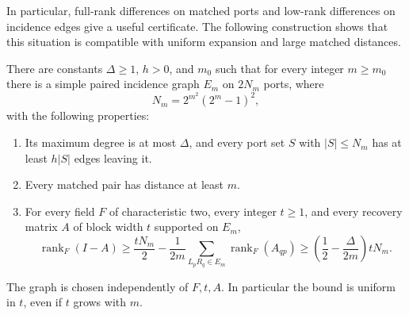 In particular, full-rank differences on matched ports and low-rank
differences on incidence edges give a useful certificate.  The following
construction shows that this situation is compatible with uniform
expansion and large matched distances.

\begin{theorem}
\notformalized
\label{thm:mc-expanding-family}
There are constants $\Delta\ge1$, $h>0$, and $m_0$ such that for every
integer $m\ge m_0$ there is a simple paired incidence graph $E_m$ on
$2N_m$ ports, where
\[
 N_m=2^{m^2}(2^m-1)^2,
\]
with the following properties:
\begin{enumerate}
\item Its maximum degree is at most $\Delta$, and every port set $S$ with
      $|S|\le N_m$ has at least $h|S|$ edges leaving it.
\item Every matched pair has distance at least $m$.
\item For every field $F$ of characteristic two, every integer $t\ge1$,
      and every recovery matrix $A$ of block width $t$ supported on $E_m$,
\begin{equation}
 \operatorname{rank}_F(I-A)
 \ge\frac{tN_m}{2}
       -\frac1{2m}\sum_{L_pR_q\in E_m}\operatorname{rank}_F(A_{qp})
 \ge\left(\frac12-\frac{\Delta}{2m}\right)tN_m.
 \label{eq:mc-expander-rank}
\end{equation}
\end{enumerate}
The graph is chosen independently of $F,t,A$.  In particular the bound
is uniform in $t$, even if $t$ grows with $m$.
\end{theorem}

